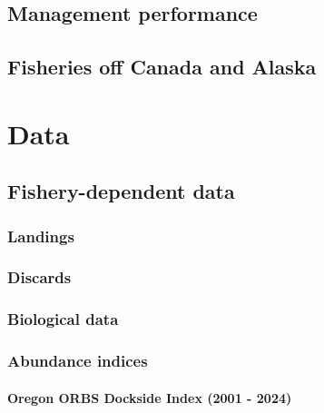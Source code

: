\documentclass[
]{scrartcl}
\let\oldparagraph\paragraph
\renewcommand{\paragraph}[1]{\oldparagraph{#1}\mbox{}}
\begin{document}
\hypertarget{management-performance-1}{%
\subsection{Management performance}\label{management-performance-1}}

\hypertarget{fisheries-off-canada-and-alaska}{%
\subsection{Fisheries off Canada and
Alaska}\label{fisheries-off-canada-and-alaska}}

\newpage{}

\hypertarget{data}{%
\section{Data}\label{data}}

\hypertarget{fishery-dependent-data}{%
\subsection{Fishery-dependent data}\label{fishery-dependent-data}}

\hypertarget{landings}{%
\subsubsection{Landings}\label{landings}}

\hypertarget{discards}{%
\subsubsection{Discards}\label{discards}}

\hypertarget{biological-data}{%
\subsubsection{Biological data}\label{biological-data}}

\hypertarget{abundance-indices}{%
\subsubsection{Abundance indices}\label{abundance-indices}}

\hypertarget{oregon-orbs-dockside-index-2001---2024}{%
\paragraph{Oregon ORBS Dockside Index (2001 -
2024)}\label{oregon-orbs-dockside-index-2001---2024}}
\end{document}
